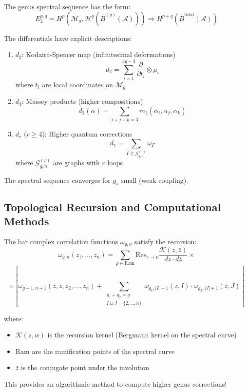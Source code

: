 \begin{spectralsequence}\label{ss:genus}
The genus spectral sequence has the form:
$$E_2^{p,q} = H^p(\overline{\mathcal{M}}_g, \mathcal{H}^q(\bar{B}^{(g)}(\mathcal{A}))) \Rightarrow H^{p+q}(\bar{B}^{\text{total}}(\mathcal{A}))$$

The differentials have explicit descriptions:
\begin{enumerate}
\item $d_2$: Kodaira-Spencer map (infinitesimal deformations)
$$d_2 = \sum_{i=1}^{3g-3} \frac{\partial}{\partial t_i} \otimes \mu_i$$
where $t_i$ are local coordinates on $\mathcal{M}_g$

\item $d_3$: Massey products (higher compositions)
$$d_3(\alpha) = \sum_{i+j+k=3} m_3(\alpha_i, \alpha_j, \alpha_k)$$

\item $d_r$ ($r \geq 4$): Higher quantum corrections
$$d_r = \sum_{\Gamma \in \mathcal{G}_{g,n}^{(r)}} \omega_\Gamma$$
where $\mathcal{G}_{g,n}^{(r)}$ are graphs with $r$ loops
\end{enumerate}

The spectral sequence converges for $g_s$ small (weak coupling).
\end{spectralsequence}


\subsection{Topological Recursion and Computational Methods}\label{subsec:recursion}

\begin{theorem}\label{thm:EO-recursion}
The bar complex correlation functions $\omega_{g,n}$ satisfy the recursion:
$$\omega_{g,n}(z_1,\ldots,z_n) = \sum_{p \in \text{Ram}} \text{Res}_{z \to p} \frac{\mathcal{K}(z,\bar{z})}{dz \cdot d\bar{z}} \times$$
$$\times \left[\omega_{g-1,n+1}(z,\bar{z},z_2,\ldots,z_n) + \sum_{\substack{g_1+g_2=g \\ I \sqcup J = \{2,\ldots,n\}}} \omega_{g_1,|I|+1}(z,I) \cdot \omega_{g_2,|J|+1}(\bar{z},J)\right]$$

where:
\begin{itemize}
\item $\mathcal{K}(z,w)$ is the recursion kernel (Bergmann kernel on the spectral curve)
\item Ram are the ramification points of the spectral curve
\item $\bar{z}$ is the conjugate point under the involution
\end{itemize}

This provides an algorithmic method to compute higher genus corrections!
\end{theorem}

